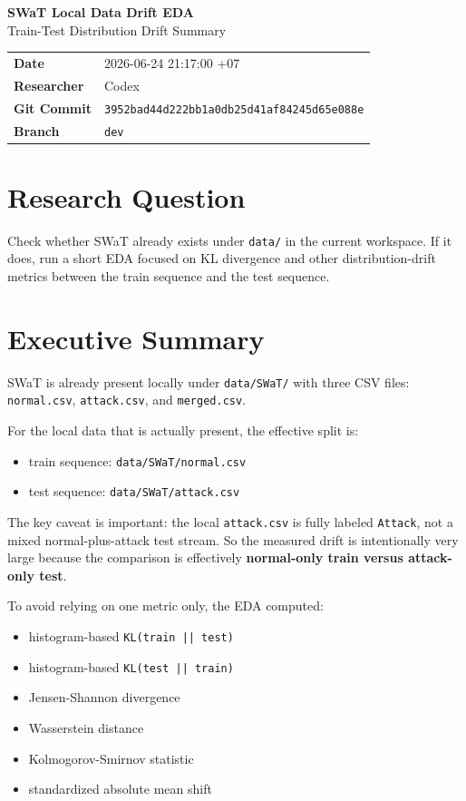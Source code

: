 \documentclass[11pt]{article}
\begin{document}
\begin{center}
{\LARGE \textbf{SWaT Local Data Drift EDA}}\\[8pt]
{\large Train-Test Distribution Drift Summary}\\[12pt]
\begin{tabular}{ll}
\textbf{Date} & 2026-06-24 21:17:00 +07 \\
\textbf{Researcher} & Codex \\
\textbf{Git Commit} & \texttt{3952bad44d222bb1a0db25d41af84245d65e088e} \\
\textbf{Branch} & \texttt{dev} \\
\end{tabular}
\end{center}

\section*{Research Question}
Check whether SWaT already exists under \texttt{data/} in the current workspace. If it does, run a short EDA focused on KL divergence and other distribution-drift metrics between the train sequence and the test sequence.

\section*{Executive Summary}
SWaT is already present locally under \texttt{data/SWaT/} with three CSV files:
\texttt{normal.csv}, \texttt{attack.csv}, and \texttt{merged.csv}.

For the local data that is actually present, the effective split is:
\begin{itemize}
\item train sequence: \texttt{data/SWaT/normal.csv}
\item test sequence: \texttt{data/SWaT/attack.csv}
\end{itemize}

The key caveat is important: the local \texttt{attack.csv} is fully labeled \texttt{Attack}, not a mixed normal-plus-attack test stream. So the measured drift is intentionally very large because the comparison is effectively \textbf{normal-only train versus attack-only test}.

To avoid relying on one metric only, the EDA computed:
\begin{itemize}
\item histogram-based \texttt{KL(train || test)}
\item histogram-based \texttt{KL(test || train)}
\item Jensen-Shannon divergence
\item Wasserstein distance
\item Kolmogorov-Smirnov statistic
\item standardized absolute mean shift
\end{itemize}
\end{document}
